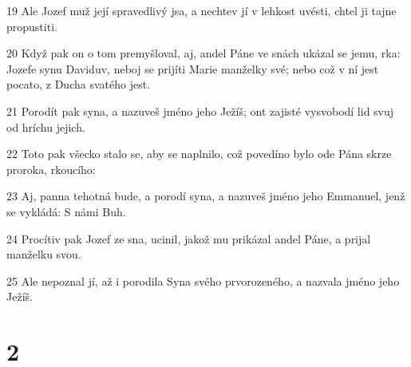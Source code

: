 \par 19 Ale Jozef muž její spravedlivý jsa, a nechtev jí v lehkost uvésti, chtel ji tajne propustiti.
\par 20 Když pak on o tom premyšloval, aj, andel Páne ve snách ukázal se jemu, rka: Jozefe synu Daviduv, neboj se prijíti Marie manželky své; nebo což v ní jest pocato, z Ducha svatého jest.
\par 21 Porodít pak syna, a nazuveš jméno jeho Ježíš; ont zajisté vysvobodí lid svuj od hríchu jejich.
\par 22 Toto pak všecko stalo se, aby se naplnilo, což povedíno bylo ode Pána skrze proroka, rkoucího:
\par 23 Aj, panna tehotná bude, a porodí syna, a nazuveš jméno jeho Emmanuel, jenž se vykládá: S námi Buh.
\par 24 Procítiv pak Jozef ze sna, ucinil, jakož mu prikázal andel Páne, a prijal manželku svou.
\par 25 Ale nepoznal jí, až i porodila Syna svého prvorozeného, a nazvala jméno jeho Ježíš.

\chapter{2}

